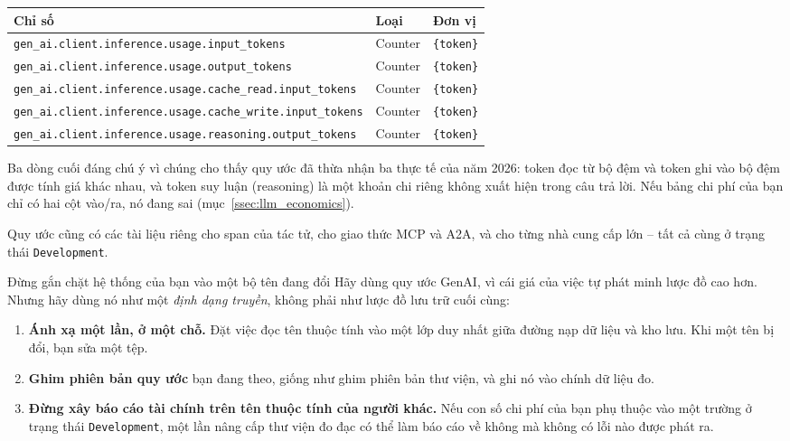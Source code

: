 \begin{center}
\footnotesize
\begin{tabular}{@{}lll@{}}
\toprule
\textbf{Chỉ số} & \textbf{Loại} & \textbf{Đơn vị} \\
\midrule
\texttt{gen\_\allowbreak ai.\allowbreak client.\allowbreak inference.\allowbreak usage.\allowbreak input\_\allowbreak tokens} & Counter & \texttt{\{token\}} \\
\texttt{gen\_\allowbreak ai.\allowbreak client.\allowbreak inference.\allowbreak usage.\allowbreak output\_\allowbreak tokens} & Counter & \texttt{\{token\}} \\
\texttt{gen\_\allowbreak ai.\allowbreak client.\allowbreak inference.\allowbreak usage.\allowbreak cache\_\allowbreak read.\allowbreak input\_\allowbreak tokens} & Counter & \texttt{\{token\}} \\
\texttt{gen\_\allowbreak ai.\allowbreak client.\allowbreak inference.\allowbreak usage.\allowbreak cache\_\allowbreak write.\allowbreak input\_\allowbreak tokens} & Counter & \texttt{\{token\}} \\
\texttt{gen\_\allowbreak ai.\allowbreak client.\allowbreak inference.\allowbreak usage.\allowbreak reasoning.\allowbreak output\_\allowbreak tokens} & Counter & \texttt{\{token\}} \\
\bottomrule
\end{tabular}
\end{center}

\noindent Ba dòng cuối đáng chú ý vì chúng cho thấy quy ước đã thừa nhận ba thực tế của năm 2026: token đọc từ bộ đệm và token ghi vào bộ đệm được tính giá khác nhau, và token suy luận (reasoning) là một khoản chi riêng không xuất hiện trong câu trả lời. Nếu bảng chi phí của bạn chỉ có hai cột vào/ra, nó đang sai (mục~\ref{ssec:llm_economics}).

Quy ước cũng có các tài liệu riêng cho span của tác tử, cho giao thức MCP và A2A, và cho từng nhà cung cấp lớn -- tất cả cùng ở trạng thái \texttt{Development}.

\begin{pitfall}{Đừng gắn chặt hệ thống của bạn vào một bộ tên đang đổi}
Hãy dùng quy ước GenAI, vì cái giá của việc tự phát minh lược đồ cao hơn. Nhưng hãy dùng nó như một \emph{định dạng truyền}, không phải như lược đồ lưu trữ cuối cùng:

\begin{enumerate}
	\item \textbf{Ánh xạ một lần, ở một chỗ.} Đặt việc đọc tên thuộc tính vào một lớp duy nhất giữa đường nạp dữ liệu và kho lưu. Khi một tên bị đổi, bạn sửa một tệp.
	\item \textbf{Ghim phiên bản quy ước} bạn đang theo, giống như ghim phiên bản thư viện, và ghi nó vào chính dữ liệu đo.
	\item \textbf{Đừng xây báo cáo tài chính trên tên thuộc tính của người khác.} Nếu con số chi phí của bạn phụ thuộc vào một trường ở trạng thái \texttt{Development}, một lần nâng cấp thư viện đo đạc có thể làm báo cáo về không mà không có lỗi nào được phát ra.
\end{enumerate}
\end{pitfall}

